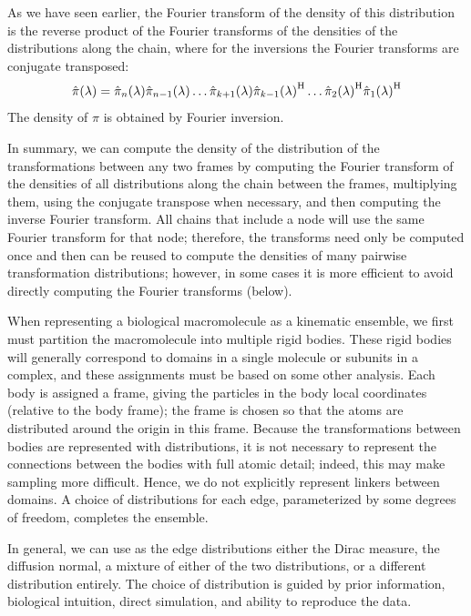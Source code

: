 \documentclass[../../main.tex]{subfiles}
\begin{document}
\begin{refsection}
	As we have seen earlier, the Fourier transform of the density of this distribution is the reverse product of the Fourier transforms of the densities of the distributions along the chain, where for the inversions the Fourier transforms are conjugate transposed:
	\begin{equation}
		\hat{\pi}(\lambda) = \hat{\pi}_{n}(\lambda) \hat{\pi}_{n-1}(\lambda) \ldots \hat{\pi}_{k+1}(\lambda) {\hat{\pi}_{k-1}(\lambda)}^\mathrm{H} \ldots {\hat{\pi}_{2}(\lambda)}^\mathrm{H} {\hat{\pi}_{1}(\lambda)}^\mathrm{H}
	\end{equation}
	The density of $\pi$ is obtained by Fourier inversion.

	In summary, we can compute the density of the distribution of the transformations between any two frames by computing the Fourier transform of the densities of all distributions along the chain between the frames, multiplying them, using the conjugate transpose when necessary, and then computing the inverse Fourier transform.
	All chains that include a node will use the same Fourier transform for that node; therefore, the transforms need only be computed once and then can be reused to compute the densities of many pairwise transformation distributions;
	however, in some cases it is more efficient to avoid directly computing the Fourier transforms (below).

	When representing a biological macromolecule as a kinematic ensemble, we first must partition the macromolecule into multiple rigid bodies.
	These rigid bodies will generally correspond to domains in a single molecule or subunits in a complex, and these assignments must be based on some other analysis.
	Each body is assigned a frame, giving the particles in the body local coordinates (relative to the body frame); the frame is chosen so that the atoms are distributed around the origin in this frame.
	Because the transformations between bodies are represented with distributions, it is not necessary to represent the connections between the bodies with full atomic detail; indeed, this may make sampling more difficult.
	Hence, we do not explicitly represent linkers between domains.
	A choice of distributions for each edge, parameterized by some degrees of freedom, completes the ensemble.

	In general, we can use as the edge distributions either the Dirac measure, the diffusion normal, a mixture of either of the two distributions, or a different distribution entirely.
	The choice of distribution is guided by prior information, biological intuition, direct simulation, and ability to reproduce the data.


\end{refsection}
\end{document}
